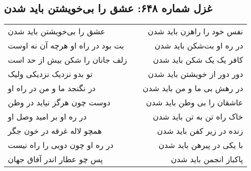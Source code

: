 \begin{center}
\section*{غزل شماره ۶۴۸: عشق را بی‌خویشتن باید شدن}
\label{sec:648}
\begin{longtable}{l p{0.5cm} r}
عشق را بی‌خویشتن باید شدن
&&
نفس خود را راهزن باید شدن
\\
بت بود در راه او هرچه آن نه اوست
&&
در ره او بت‌شکن باید شدن
\\
زلف جانان را شکن بیش از حد است
&&
کافر یک یک شکن باید شدن
\\
تو بدو نزدیک نزدیکی ولیک
&&
دور دور از خویشتن باید شدن
\\
در نگنجد ما و من در راه او
&&
در رهش بی ما و من باید شدن
\\
دوست چون هرگز نیاید در وطن
&&
عاشقان را بی وطن باید شدن
\\
در ره او بر امید وصل او
&&
خاک راه تن به تن باید شدن
\\
همچو لاله غرقه در خون جگر
&&
زنده در زیر کفن باید شدن
\\
در ره او چون دویی را راه نیست
&&
با یکی در پیرهن باید شدن
\\
پس چو عطار اندر آفاق جهان
&&
پاکباز انجمن باید شدن
\\
\end{longtable}
\end{center}
